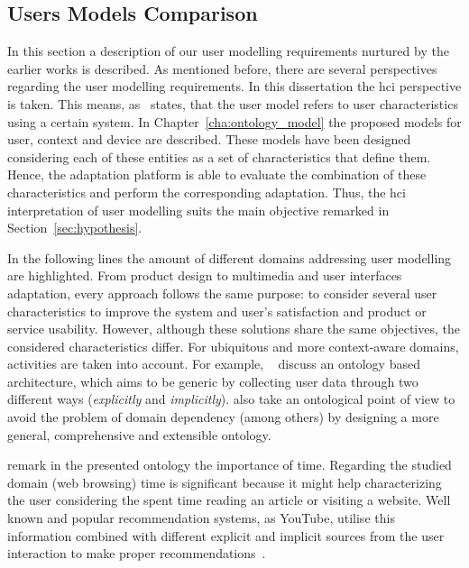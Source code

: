 
\subsection{Users Models Comparison}
\label{sec:user_model_comparison}

In this section a description of our user modelling requirements nurtured by the 
earlier works is described. As mentioned before, there are several perspectives 
regarding the user modelling requirements. In this dissertation the \ac{hci} 
perspective is taken. This means, as~\citet{pohl_logic_based_1999} states, 
that the user model refers to user characteristics using a certain system. 
In Chapter~\ref{cha:ontology_model} the proposed models for user, context and device are described. These models
have been designed considering each of these entities as a set of characteristics
that define them. Hence, the adaptation platform is able to evaluate the
combination of these characteristics and perform the corresponding adaptation.
Thus, the \ac{hci} interpretation of user modelling suits the main objective 
remarked in Section~\ref{sec:hypothesis}.


In the following lines the amount of different domains addressing user modelling 
are highlighted. From product design to multimedia and user interfaces adaptation, 
every approach follows the same purpose: to consider several user characteristics 
to improve the system and user's satisfaction and product or service usability. 
However, although these solutions share the same objectives, the considered 
characteristics differ. For ubiquitous and more context-aware domains, activities 
are taken into account. For example, ~\citet{razmerita_ontology_based_2003} 
discuss an ontology based architecture, which aims to be generic by collecting 
user data through two different ways (\textit{explicitly} and \textit{implicitly}).
\citet{golemati_creating_2007} also take an ontological point of view to avoid 
the problem of domain dependency (among others) by designing a more general, 
comprehensive and extensible ontology. 

\citet{gauch_ontology_based_2003} remark in the presented ontology the 
importance of time. Regarding the studied domain (web browsing) time is 
significant because it might help characterizing the user considering the spent 
time reading an article or visiting a website. Well known and popular 
recommendation systems, as YouTube, utilise this information combined with 
different explicit and implicit sources from the user interaction to make proper
recommendations~\citep{davidson_youtube_2010}.


